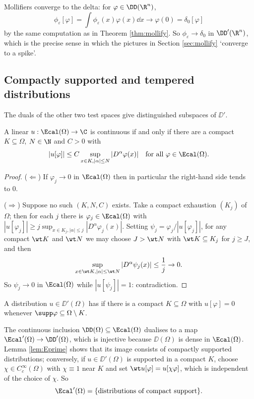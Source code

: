 \begin{example}
	Mollifiers converge to the delta: for $\varphi \in \DD(\R^n)$,
	$$\phi_\varepsilon[\varphi]=\int\phi_\varepsilon(x)\varphi(x)\dd x \to \varphi(0)=\delta_0[\varphi]$$
	by the same computation as in Theorem \ref{thm:mollify}. So $\phi_\varepsilon \to \delta_0$ in $\DD'(\R^n)$, which is the precise sense in which the pictures in Section \ref{sec:mollify} `converge to a spike'.
\end{example}

\subsection{Compactly supported and tempered distributions}

The duals of the other two test spaces give distinguished subspaces of $\DD'$.

\begin{lemma}\label{lem:Eprime}
	A linear $u : \Ecal(\Omega)\to\C$ is continuous if and only if there are a compact $K \subseteq \Omega$, $N \in \N$ and $C>0$ with
	$$|u[\varphi]|\le C\sup_{x\in K, |\alpha|\le N}|D^\alpha\varphi(x)| \quad\text{for all }\varphi\in\Ecal(\Omega).$$
\end{lemma}

\begin{proof}
	($\Leftarrow$) If $\varphi_j\to0$ in $\Ecal(\Omega)$ then in particular the right-hand side tends to $0$.

	($\Rightarrow$) Suppose no such $(K,N,C)$ exists. Take a compact exhaustion $(K_j)$ of $\Omega$; then for each $j$ there is $\varphi_j\in\Ecal(\Omega)$ with $|u[\varphi_j]|\ge j\sup_{x\in K_j,|\alpha|\le j}|D^\alpha\varphi_j(x)|$. Setting $\psi_j=\varphi_j/|u[\varphi_j]|$, for any compact $\wt K$ and $\wt N$ we may choose $J>\wt N$ with $\wt K\subseteq K_j$ for $j \ge J$, and then
	$$\sup_{x\in\wt K,|\alpha|\le\wt N}|D^\alpha\psi_j(x)|\le\frac1j\to0.$$
	So $\psi_j\to0$ in $\Ecal(\Omega)$ while $|u[\psi_j]|=1$: contradiction.
\end{proof}

\begin{definition}
	A distribution $u \in \DD'(\Omega)$ has  if there is a compact $K\subseteq\Omega$ with $u[\varphi]=0$ whenever $\supp\varphi\subseteq\Omega\setminus K$.
\end{definition}

The continuous inclusion $\DD(\Omega)\subseteq\Ecal(\Omega)$ dualises to a map $\Ecal'(\Omega)\to\DD'(\Omega)$, which is injective because $\DD(\Omega)$ is dense in $\Ecal(\Omega)$. Lemma \ref{lem:Eprime} shows that its image consists of compactly supported distributions; conversely, if $u \in \DD'(\Omega)$ is supported in a compact $K$, choose $\chi \in C_c^\infty(\Omega)$ with $\chi\equiv1$ near $K$ and set $\wt u[\varphi]=u[\chi\varphi]$, which is independent of the choice of $\chi$. So
$$\Ecal'(\Omega)=\{\text{distributions of compact support}\}.$$

